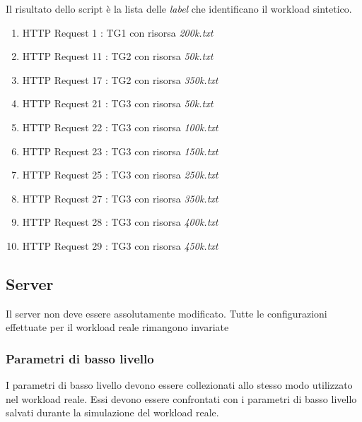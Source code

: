 Il risultato dello script è la lista delle \textit{label} che identificano il workload sintetico.
\begin{enumerate}
	\item HTTP Request 1 : TG1 con risorsa \textit{200k.txt}
	\item HTTP Request 11 : TG2 con risorsa \textit{50k.txt}
	\item HTTP Request 17 : TG2 con risorsa \textit{350k.txt}
	\item HTTP Request 21 : TG3 con risorsa \textit{50k.txt}	
	\item HTTP Request 22 : TG3 con risorsa \textit{100k.txt}		
	\item HTTP Request 23 : TG3 con risorsa \textit{150k.txt}		
	\item HTTP Request 25 : TG3 con risorsa \textit{250k.txt}		
	\item HTTP Request 27 : TG3 con risorsa \textit{350k.txt}
	\item HTTP Request 28 : TG3 con risorsa \textit{400k.txt}			
	\item HTTP Request 29 : TG3 con risorsa \textit{450k.txt}		
\end{enumerate}

\subsection{Server}
Il server non deve essere assolutamente modificato. Tutte le configurazioni effettuate per il workload reale rimangono invariate

\subsubsection{Parametri di basso livello}
I parametri di basso livello devono essere collezionati allo stesso modo utilizzato nel workload reale. Essi devono essere confrontati con i parametri di basso livello salvati durante la simulazione del workload reale.

